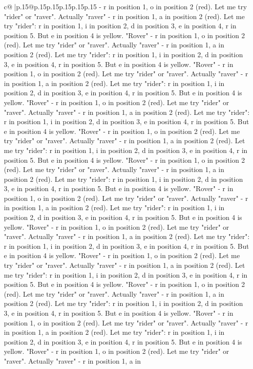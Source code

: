\documentclass{article}
\begin{document}
{\begin{supertabular}{c@{$\;$}|p{.15\linewidth}@{}p{.15\linewidth}p{.15\linewidth}p{.15\linewidth}p{.15\linewidth}p{.15\linewidth}}
{{{{-} r in position 1, o in position 2 (red). Let me try "rider" or "raver". Actually "raver" {-} r in position 1, a in position 2 (red). Let me try "rider": r in position 1, i in position 2, d in position 3, e in position 4, r in position 5. But e in position 4 is yellow. "Rover" {-} r in position 1, o in position 2 (red). Let me try "rider" or "raver". Actually "raver" {-} r in position 1, a in position 2 (red). Let me try "rider": r in position 1, i in position 2, d in position 3, e in position 4, r in position 5. But e in position 4 is yellow. "Rover" {-} r in position 1, o in position 2 (red). Let me try "rider" or "raver". Actually "raver" {-} r in position 1, a in position 2 (red). Let me try "rider": r in position 1, i in position 2, d in position 3, e in position 4, r in position 5. But e in position 4 is yellow. "Rover" {-} r in position 1, o in position 2 (red). Let me try "rider" or "raver". Actually "raver" {-} r in position 1, a in position 2 (red). Let me try "rider": r in position 1, i in position 2, d in position 3, e in position 4, r in position 5. But e in position 4 is yellow. "Rover" {-} r in position 1, o in position 2 (red). Let me try "rider" or "raver". Actually "raver" {-} r in position 1, a in position 2 (red). Let me try "rider": r in position 1, i in position 2, d in position 3, e in position 4, r in position 5. But e in position 4 is yellow. "Rover" {-} r in position 1, o in position 2 (red). Let me try "rider" or "raver". Actually "raver" {-} r in position 1, a in position 2 (red). Let me try "rider": r in position 1, i in position 2, d in position 3, e in position 4, r in position 5. But e in position 4 is yellow. "Rover" {-} r in position 1, o in position 2 (red). Let me try "rider" or "raver". Actually "raver" {-} r in position 1, a in position 2 (red). Let me try "rider": r in position 1, i in position 2, d in position 3, e in position 4, r in position 5. But e in position 4 is yellow. "Rover" {-} r in position 1, o in position 2 (red). Let me try "rider" or "raver". Actually "raver" {-} r in position 1, a in position 2 (red). Let me try "rider": r in position 1, i in position 2, d in position 3, e in position 4, r in position 5. But e in position 4 is yellow. "Rover" {-} r in position 1, o in position 2 (red). Let me try "rider" or "raver". Actually "raver" {-} r in position 1, a in position 2 (red). Let me try "rider": r in position 1, i in position 2, d in position 3, e in position 4, r in position 5. But e in position 4 is yellow. "Rover" {-} r in position 1, o in position 2 (red). Let me try "rider" or "raver". Actually "raver" {-} r in position 1, a in position 2 (red). Let me try "rider": r in position 1, i in position 2, d in position 3, e in position 4, r in position 5. But e in position 4 is yellow. "Rover" {-} r in position 1, o in position 2 (red). Let me try "rider" or "raver". Actually "raver" {-} r in position 1, a in position 2 (red). Let me try "rider": r in position 1, i in position 2, d in position 3, e in position 4, r in position 5. But e in position 4 is yellow. "Rover" {-} r in position 1, o in position 2 (red). Let me try "rider" or "raver". Actually "raver" {-} r in position 1, a in }}}
\end{supertabular}}
\end{document}
